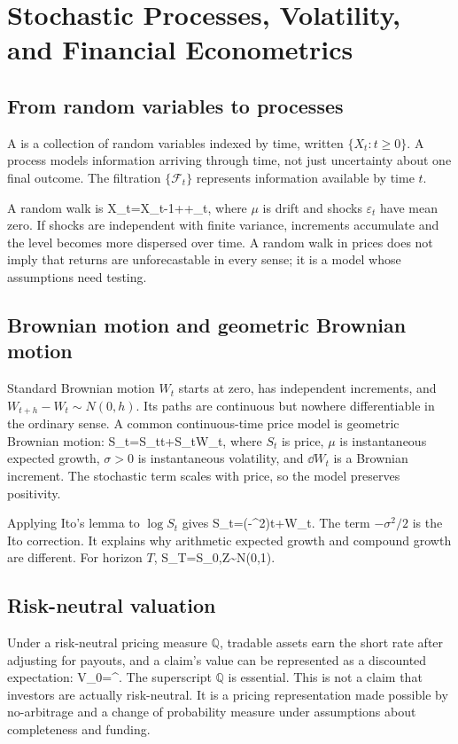 \chapter{Stochastic Processes, Volatility, and Financial Econometrics}

\section{From random variables to processes}
A  is a collection of random variables indexed by time, written $\{X_t:t\geq0\}$. A process models information arriving through time, not just uncertainty about one final outcome. The filtration $\{\mathcal{F}_t\}$ represents information available by time $t$.

A random walk is
  X_t=X_{t-1}+\mu+\varepsilon_t,
\closeformula
where $\mu$ is drift and shocks $\varepsilon_t$ have mean zero. If shocks are independent with finite variance, increments accumulate and the level becomes more dispersed over time. A random walk in prices does not imply that returns are unforecastable in every sense; it is a model whose assumptions need testing.

\section{Brownian motion and geometric Brownian motion}
Standard Brownian motion $W_t$ starts at zero, has independent increments, and $W_{t+h}-W_t\sim N(0,h)$. Its paths are continuous but nowhere differentiable in the ordinary sense. A common continuous-time price model is geometric Brownian motion:
  \dd S_t=\mu S_t\dd t+\sigma S_t\dd W_t,
\closeformula
where $S_t$ is price, $\mu$ is instantaneous expected growth, $\sigma>0$ is instantaneous volatility, and $\dd W_t$ is a Brownian increment. The stochastic term scales with price, so the model preserves positivity.

Applying Ito's lemma to $\log S_t$ gives
  \dd\log S_t=\left(\mu-\sigma^2\right)\dd t+\sigma\dd W_t.
\closeformula
The term $-\sigma^2/2$ is the Ito correction. It explains why arithmetic expected growth and compound growth are different. For horizon $T$,
  S_T=S_0\exp{},\qquad Z\sim N(0,1).
\closeformula

\section{Risk-neutral valuation}
Under a risk-neutral pricing measure $\mathbb{Q}$, tradable assets earn the short rate after adjusting for payouts, and a claim's value can be represented as a discounted expectation:
  V_0=\E^{}.
\closeformula
The superscript $\mathbb{Q}$ is essential. This is not a claim that investors are actually risk-neutral. It is a pricing representation made possible by no-arbitrage and a change of probability measure under assumptions about completeness and funding.

